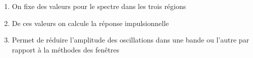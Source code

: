 \documentclass{beamer}
\begin{document}
\begin{frame}
\begin{center}
\begin{tikzpicture}
\end{tikzpicture}
\end{center}
\vspace{0.3cm}

\vspace{0.1cm}
\begin{enumerate}
\item<2-> On fixe des valeurs pour le spectre dans les trois régions
\item<3-> De ces valeurs on calcule la réponse impulsionnelle
\item<4-> Permet de réduire l'amplitude des oscillations dans une bande ou l'autre par rapport à la méthodes des fenêtres
\end{enumerate}


\end{frame}
\end{document}
